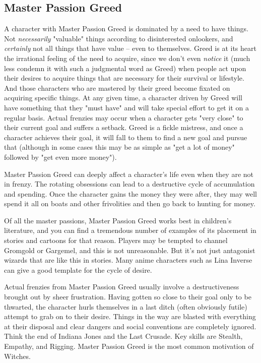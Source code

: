 \subsection{Master Passion Greed}

A character with Master Passion Greed is dominated by a need to have things. Not \textit{necessarily} "valuable" things according to disinterested onlookers, and \textit{certainly} not all things that have value -- even to themselves. Greed is at its heart the irrational feeling of the need to acquire, since we don't even \textit{notice} it (much less condemn it with such a judgmental word as Greed) when people act upon their desires to acquire things that are necessary for their survival or lifestyle. And those characters who are mastered by their greed become fixated on acquiring specific things. At any given time, a character driven by Greed will have something that they "must have" and will take special effort to get it on a regular basis. Actual frenzies may occur when a character gets "very close" to their current goal and suffers a setback. Greed is a fickle mistress, and once a character achieves their goal, it will fall to them to find a new goal and pursue that (although in some cases this may be as simple as "get a lot of money" followed by "get even more money").

Master Passion Greed can deeply affect a character's life even when they are not in frenzy. The rotating obsessions can lead to a destructive cycle of accumulation and spending. Once the character gains the money they were after, they may well spend it all on boats and other frivolities and then go back to hunting for money.

Of all the master passions, Master Passion Greed works best in children's literature, and you can find a tremendous number of examples of its placement in stories and cartoons for that reason. Players may be tempted to channel Gromgold or Gargemel, and this is not unreasonable. But it's not just antagonist wizards that are like this in stories. Many anime characters such as Lina Inverse can give a good template for the cycle of desire.

Actual frenzies from Master Passion Greed usually involve a destructiveness brought out by sheer frustration. Having gotten so close to their goal only to be thwarted, the character hurls themselves in a last ditch (often obviously futile) attempt to grab on to their desire. Things in the way are blasted with everything at their disposal and clear dangers and social conventions are completely ignored. Think the end of Indiana Jones and the Last Crusade. Key skills are Stealth, Empathy, and Rigging. Master Passion Greed is the most common motivation of Witches.


